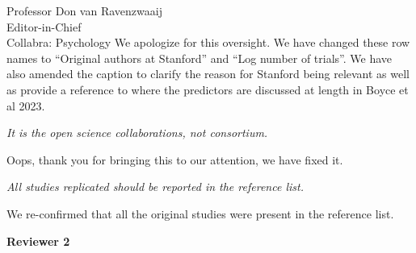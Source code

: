 \documentclass{stanfordletter}
\newcounter{section}
\newcommand{\section}[1]{
	\bigskip
	{\normalfont\Large\bfseries #1}}
\newcommand{\theysaid}[1]{\begin{leftbar} \noindent 
		\textsl{ #1}\end{leftbar}}
\newcommand{\revised}[1]{\begin{quote}	#1 \end{quote}}
\begin{document}
\begin{letter}{Professor Don van Ravenzwaaij \\ Editor-in-Chief \\ Collabra: Psychology }
	We apologize for this oversight. We have changed these row names to ``Original authors at Stanford'' and 
	``Log number of trials''. We have also amended the caption to clarify the reason for Stanford being relevant as well as provide a reference to where the predictors are discussed at length in Boyce et al 2023. 
	
	
	
	
	\theysaid{It is the open science collaborations, not consortium.}
	
	Oops, thank you for bringing this to our attention, we have fixed it. 
	
	\theysaid{All studies replicated should be reported in the reference list.}
	We re-confirmed that all the original studies were present in the reference list. 
	
	
	\section{Reviewer 2}
	
	
	

\end{letter}
\end{document}
